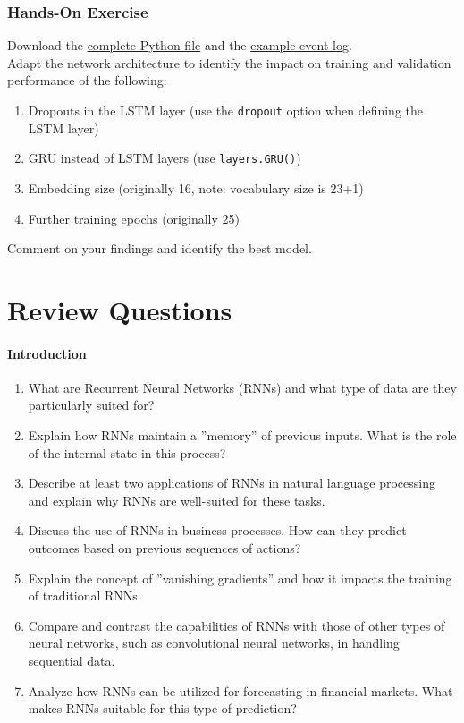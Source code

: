 \begin{tcolorbox}[colback=code]
\subsubsection*{Hands-On Exercise} 

Download the \href{https://github.com/jevermann/busi4720-ml/blob/main/process_prediction.py}{complete Python file} and the \href{https://evermann.ca/busi4720/BPI_Challenge_2012.xes.gz}{example event log}. \\

Adapt the network architecture to identify the impact on training and validation performance of the following:
   \begin{enumerate}
      \item Dropouts in the LSTM layer (use the \texttt{dropout} option when defining the LSTM layer)
      \item GRU instead of LSTM layers (use \texttt{layers.GRU()})
      \item Embedding size (originally 16, note: vocabulary size is 23+1)
      \item Further training epochs (originally 25)
   \end{enumerate}
Comment on your findings and identify the best model. \\
\end{tcolorbox}

\section{Review Questions}
\paragraph*{Introduction}
\begin{enumerate}[nosep]
	\item What are Recurrent Neural Networks (RNNs) and what type of data are they particularly suited for?
	\item Explain how RNNs maintain a ''memory'' of previous inputs. What is the role of the internal state in this process?
	\item Describe at least two applications of RNNs in natural language processing and explain why RNNs are well-suited for these tasks.
	\item Discuss the use of RNNs in business processes. How can they predict outcomes based on previous sequences of actions?
	\item Explain the concept of ''vanishing gradients'' and how it impacts the training of traditional RNNs.
	\item Compare and contrast the capabilities of RNNs with those of other types of neural networks, such as convolutional neural networks, in handling sequential data.
	\item Analyze how RNNs can be utilized for forecasting in financial markets. What makes RNNs suitable for this type of prediction?
\end{enumerate}

